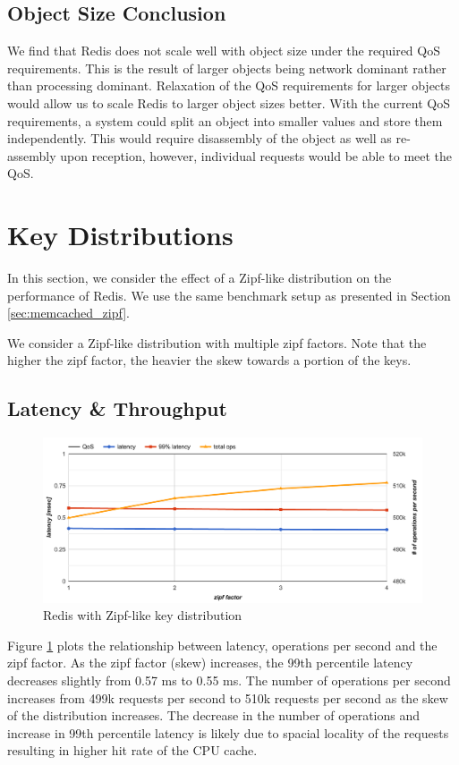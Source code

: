 \subsection{Object Size Conclusion}
We find that Redis does not scale well with object size under the required QoS requirements. This is the result of larger objects being network dominant rather than processing dominant. Relaxation of the QoS requirements for larger objects would allow us to scale Redis to larger object sizes better. With the current QoS requirements, a system could split an object into smaller values and store them independently. This would require disassembly of the object as well as re-assembly upon reception, however, individual requests would be able to meet the QoS.

\section{Key Distributions}
In this section, we consider the effect of a Zipf-like distribution on the performance of Redis. We use the same benchmark setup as presented in Section \ref{sec:memcached_zipf}.

We consider a Zipf-like distribution with multiple zipf factors. Note that the higher the zipf factor, the heavier the skew towards a portion of the keys.

\subsection{Latency \& Throughput}
\begin{figure}[h]
    \includegraphics[width=\textwidth]{./res2/r_zipf.png}
    \caption{Redis with Zipf-like key distribution}
    \label{fig:r_zipf}
\end{figure}

Figure \ref{fig:r_zipf} plots the relationship between latency, operations per second and the zipf factor. As the zipf factor (skew) increases, the 99th percentile latency decreases slightly from 0.57 ms to 0.55 ms. The number of operations per second increases from 499k requests per second to 510k requests per second as the skew of the distribution increases. The decrease in the number of operations and increase in 99th percentile latency is likely due to spacial locality of the requests resulting in higher hit rate of the CPU cache.

